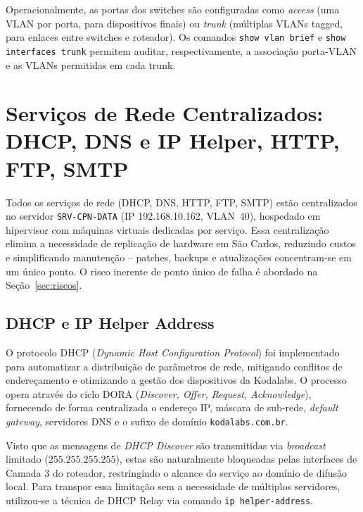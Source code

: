 \documentclass[12pt,a4paper]{article}
\begin{document}
Operacionalmente, as portas dos switches são configuradas como \textit{access}
(uma VLAN por porta, para dispositivos finais) ou \textit{trunk} (múltiplas VLANs
tagged, para enlaces entre switches e roteador). Os comandos \texttt{show vlan brief}
e \texttt{show interfaces trunk} permitem auditar, respectivamente, a associação
porta-VLAN e as VLANs permitidas em cada trunk.

\section{Serviços de Rede Centralizados: DHCP, DNS e IP Helper, HTTP, FTP, SMTP}

Todos os serviços de rede (DHCP, DNS, HTTP, FTP, SMTP) estão centralizados no
servidor \texttt{SRV-CPN-DATA} (IP 192.168.10.162, VLAN~40), hospedado em
hipervisor com máquinas virtuais dedicadas por serviço. Essa centralização elimina
a necessidade de replicação de hardware em São Carlos, reduzindo custos e
simplificando manutenção -- patches, backups e atualizações concentram-se em um
único ponto. O risco inerente de ponto único de falha é abordado na
Seção~\ref{sec:riscos}.

\subsection{DHCP e IP Helper Address}
O protocolo DHCP (\textit{Dynamic Host Configuration Protocol}) foi implementado para automatizar a distribuição de parâmetros de rede, mitigando conflitos de endereçamento e otimizando a gestão dos dispositivos da Kodalabs. O processo opera através do ciclo DORA (\textit{Discover, Offer, Request, Acknowledge}), fornecendo de forma centralizada o endereço IP, máscara de sub-rede, \textit{default gateway}, servidores DNS e o sufixo de domínio \texttt{kodalabs.com.br}.

Visto que as mensagens de \textit{DHCP Discover} são transmitidas via \textit{broadcast} limitado ($255.255.255.255$), estas são naturalmente bloqueadas pelas interfaces de Camada 3 do roteador, restringindo o alcance do serviço ao domínio de difusão local. Para transpor essa limitação sem a necessidade de múltiplos servidores, utilizou-se a técnica de DHCP Relay via comando \texttt{ip helper-address}.
\end{document}
